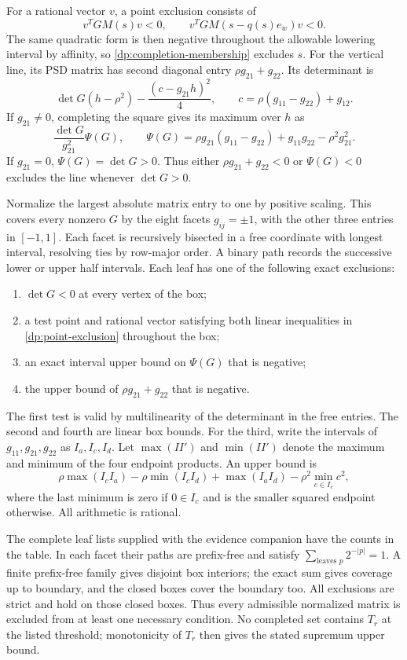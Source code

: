 For a rational vector $v$, a point exclusion consists of
\begin{equation}\label{dp:point-exclusion}
 v^TGM(s)v<0,\qquad v^TGM(s-q(s)e_w)v<0.
\end{equation}
The same quadratic form is then negative throughout the allowable lowering
interval by affinity, so \cref{dp:completion-membership} excludes $s$.
For the vertical line, its PSD matrix has second diagonal entry
$\rho g_{21}+g_{22}$. Its determinant is
\[
 \det G(h-\rho^2)-\frac{(c-g_{21}h)^2}{4},\qquad
 c=\rho(g_{11}-g_{22})+g_{12}.
\]
If $g_{21}\ne0$, completing the square gives its maximum over $h$ as
\begin{equation}\label{dp:psi}
 \frac{\det G}{g_{21}^2}\Psi(G),\qquad
 \Psi(G)=\rho g_{21}(g_{11}-g_{22})+g_{11}g_{22}-\rho^2g_{21}^2.
\end{equation}
If $g_{21}=0$, $\Psi(G)=\det G>0$. Thus either
$\rho g_{21}+g_{22}<0$ or $\Psi(G)<0$ excludes the line whenever
$\det G>0$.

Normalize the largest absolute matrix entry to one by positive scaling.
This covers every nonzero $G$ by the eight facets
$g_{ij}=\pm1$, with the other three entries in $[-1,1]$.
Each facet is recursively bisected in a free coordinate with longest
interval, resolving ties by row-major order. A binary path records the
successive lower or upper half intervals. Each leaf has one of the following
exact exclusions:
\begin{enumerate}
 \item $\det G<0$ at every vertex of the box;
 \item a test point and rational vector satisfying both linear inequalities
       in \cref{dp:point-exclusion} throughout the box;
 \item an exact interval upper bound on $\Psi(G)$ that is negative;
 \item the upper bound of $\rho g_{21}+g_{22}$ that is negative.
\end{enumerate}
The first test is valid by multilinearity of the determinant in the free
entries. The second and fourth are linear box bounds. For the third, write
the intervals of $g_{11},g_{21},g_{22}$ as $I_a,I_c,I_d$. Let
$\max(I I')$ and $\min(I I')$ denote the maximum and minimum of the
four endpoint products. An upper bound is
\[
 \rho\max(I_cI_a)-\rho\min(I_cI_d)+\max(I_aI_d)
 -\rho^2\min_{c\in I_c}c^2,
\]
where the last minimum is zero if $0\in I_c$ and is the smaller squared
endpoint otherwise. All arithmetic is rational.

The complete leaf lists supplied with the evidence companion have the counts
in the table. In each facet their paths are prefix-free and satisfy
$\sum_{\text{leaves }p}2^{-|p|}=1$. A finite prefix-free family gives
disjoint box interiors; the exact sum gives coverage up to boundary, and
the closed boxes cover the boundary too. All exclusions are strict and
hold on those closed boxes. Thus every admissible normalized matrix is excluded from
at least one necessary condition. No completed set contains $T_r$ at the
listed threshold; monotonicity of $T_r$ then gives the stated supremum
upper bound.

